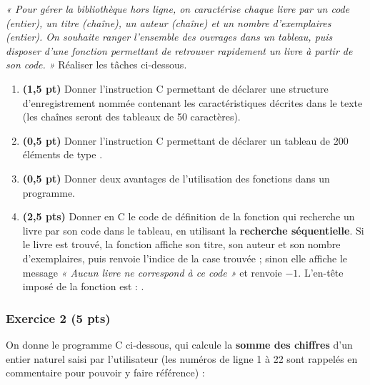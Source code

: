\noindent\emph{« Pour gérer la bibliothèque hors ligne, on caractérise chaque
livre par un code (entier), un titre (chaîne), un auteur (chaîne) et un nombre
d'exemplaires (entier). On souhaite ranger l'ensemble des ouvrages dans un
tableau, puis disposer d'une fonction permettant de retrouver rapidement un
livre à partir de son code. »} Réaliser les tâches ci-dessous.

\begin{enumerate}[label=\textbf{\arabic*.}]
\item \textbf{(1,5 pt)} Donner l'instruction C permettant de déclarer une
structure d'enregistrement nommée  contenant les caractéristiques
décrites dans le texte (les chaînes seront des tableaux de 50 caractères).
\item \textbf{(0,5 pt)} Donner l'instruction C permettant de déclarer un tableau
 de 200 éléments de type .
\item \textbf{(0,5 pt)} Donner deux avantages de l'utilisation des fonctions
dans un programme.
\item \textbf{(2,5 pts)} Donner en C le code de définition de la fonction
 qui recherche un livre par son code dans le tableau, en
utilisant la \textbf{recherche séquentielle}. Si le livre est trouvé, la
fonction affiche son titre, son auteur et son nombre d'exemplaires, puis renvoie
l'indice de la case trouvée ; sinon elle affiche le message \emph{« Aucun livre
ne correspond à ce code »} et renvoie $-1$. L'en-tête imposé de la fonction est :
.
\end{enumerate}

\subsubsection*{Exercice 2 \hfill (5 pts)}

\noindent On donne le programme C ci-dessous, qui calcule la \textbf{somme des
chiffres} d'un entier naturel saisi par l'utilisateur (les numéros de ligne 1 à
22 sont rappelés en commentaire pour pouvoir y faire référence) :


